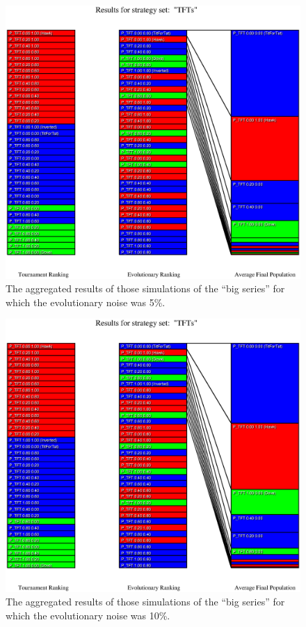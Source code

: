 \begin{figure}
\begin{center}
\includegraphics[width=20cm]{tables/TFTs_N0.050.eps}
\caption{\label{TFTs_N0050} The aggregated results of those
simulations of the ``big series'' for which the evolutionary noise was 5\%.}
\end{center}
\end{figure}

\begin{figure}
\begin{center}
\includegraphics[width=20cm]{tables/TFTs_N0.100.eps}
\caption{\label{TFTs_N0100} The aggregated results of those
simulations of the ``big series'' for which the evolutionary noise was 10\%.}
\end{center}
\end{figure}


